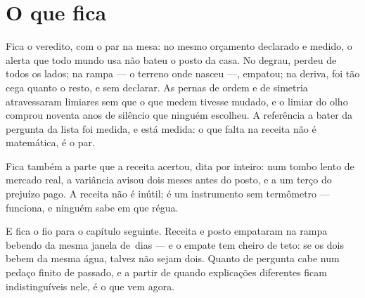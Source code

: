 \section{O que fica}

Fica o veredito, com o par na mesa: no mesmo orçamento declarado e medido, o alerta que todo
mundo usa não bateu o posto da casa. No degrau, perdeu de todos os lados; na rampa --- o
terreno onde nasceu ---, empatou; na deriva, foi tão cega quanto o resto, e sem declarar. As
pernas de ordem e de simetria atravessaram limiares sem que o que medem tivesse mudado, e o
limiar do olho comprou noventa anos de silêncio que ninguém escolheu. A referência a bater da
pergunta da lista foi medida, e está medida: o que falta na receita não é matemática, é o par.

Fica também a parte que a receita acertou, dita por inteiro: num tombo lento de mercado real,
a variância avisou dois meses antes do posto, e a um terço do prejuízo pago. A receita não é
inútil; é um instrumento sem termômetro --- funciona, e ninguém sabe em que régua.

E fica o fio para o capítulo seguinte. Receita e posto empataram na rampa bebendo da mesma
janela de \numAlertaJanela{}\,dias --- e o empate tem cheiro de teto: se os dois bebem da
mesma água, talvez não sejam dois. Quanto de pergunta cabe num pedaço finito de passado, e a
partir de quando explicações diferentes ficam indistinguíveis nele, é o que vem agora.

